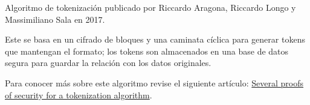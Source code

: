 %
%

Algoritmo de tokenización publicado por Riccardo Aragona,
Riccardo Longo y Massimiliano Sala en 2017.

Este se basa en un cifrado de bloques y una caminata cíclica
para generar tokens que mantengan el formato; los tokens son
almacenados en una base de datos segura para guardar la relación
con los datos originales.

Para conocer más sobre este algoritmo revise el siguiente
artículo:
\href{https://link.springer.com/article/10.1007%2Fs00200-017-0313-3}
{Several proofs of security for a tokenization algorithm}.
